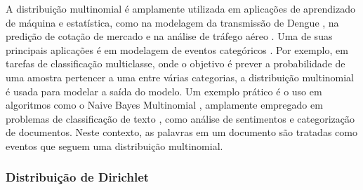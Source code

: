 A distribuição multinomial \citep{seber2015-multi} é amplamente utilizada em aplicações de aprendizado de máquina e estatística, como na modelagem da transmissão de Dengue \citep{wang2025}, na predição de cotação de mercado \citep{nevasalmi2020} e na análise de tráfego aéreo \citep{torres2023}. Uma de suas principais aplicações é em modelagem de eventos categóricos \citep{kibriya2004,luo2021}. Por exemplo, em tarefas de classificação multiclasse, onde o objetivo é prever a probabilidade de uma amostra pertencer a uma entre várias categorias, a distribuição multinomial é usada para modelar a saída do modelo. Um exemplo prático é o uso em algoritmos como o Naive Bayes Multinomial \citep{kalcheva2023,jiang2016}, amplamente empregado em problemas de classificação de texto \citep{odeh2022,kan2005}, como análise de sentimentos \citep{saravanan2023} e categorização de documentos. Neste contexto, as palavras em um documento são tratadas como eventos que seguem uma distribuição multinomial.





\subsubsection{Distribuição de Dirichlet}
\label{sec:modelo-dir}

